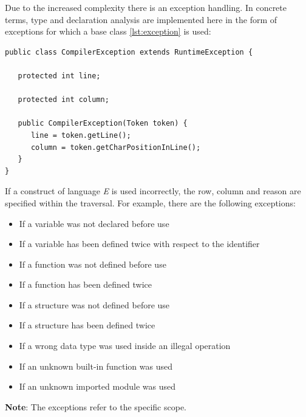 Due to the increased complexity there is an exception handling. In concrete terms, type and declaration analysis are implemented here in the form of exceptions for which a base class \ref{lst:exception} is used:

\begin{lstlisting}[frame=htrbl, caption={Implementation of {\ttfamily CompilerException.java}}, label={lst:exception}, basicstyle=\footnotesize]
public class CompilerException extends RuntimeException {

   protected int line;

   protected int column;

   public CompilerException(Token token) {
      line = token.getLine();
      column = token.getCharPositionInLine();
   }
}
\end{lstlisting}

If a construct of language \emph{E} is used incorrectly, the row, column and reason are specified within the traversal. For example, there are the following exceptions:

\begin{itemize}
	\item If a variable was not declared before use
	\item If a variable has been defined twice with respect to the identifier
	\item If a function was not defined before use
	\item If a function has been defined twice
	\item If a structure was not defined before use
	\item If a structure has been defined twice
	\item If a wrong data type was used inside an illegal operation
	\item If an unknown built-in function was used
	\item If an unknown imported module was used
\end{itemize}

\textbf{Note}: The exceptions refer to the specific scope.

